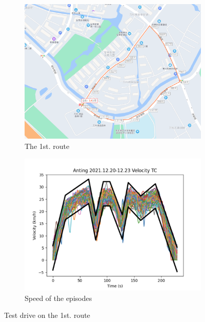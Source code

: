 \documentclass{article}
\begin{document}
\begin{figure}[htbp]
	\centering
	\begin{subfigure}[t]{0.4\textwidth}
		\centering
		\includegraphics[width=\textwidth]{images/openroad_a_map.png}
		\caption{The 1st. route}\label{fig:1st route}
	\end{subfigure}
	\quad\quad
	\begin{subfigure}[t]{0.4\textwidth}
		\centering
		\includegraphics[width=\textwidth]{images/openroad_a_velocity.png}
		\caption{Speed of the episodes}\label{fig:openroad a speed}
	\end{subfigure}
	\caption{Test drive on the 1st. route\label{fig:open road a}}
\end{figure}
\end{document}
